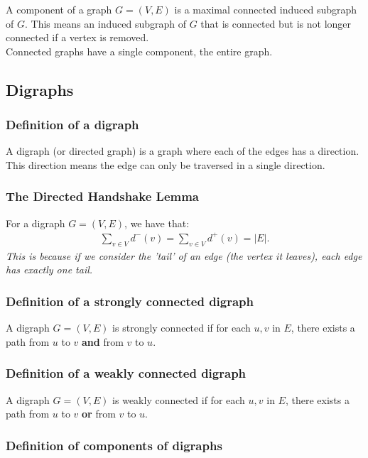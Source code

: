\documentclass[a4paper, 12pt, twoside]{article}
\begin{document}
A component of a graph $G = (V, E)$ is a maximal connected 
induced subgraph of $G$. This means an induced subgraph of $G$
that is connected but is not longer connected if a vertex is
removed.
\\[\baselineskip]
Connected graphs have a single component, the entire graph.

\subsection{Digraphs}

\subsubsection{Definition of a digraph}

A digraph (or directed graph) is a graph where each of the edges
has a direction. This direction means the edge can only be traversed
in a single direction.

\subsubsection{The Directed Handshake Lemma}

For a digraph $G = (V, E)$, we have that: \begin{gather*}
  \sum_{v \in V} d^-(v) = \sum_{v \in V} d^+(v) = |E|.
\end{gather*} \textit{This is because if we consider the 'tail' of an
edge (the vertex it leaves), each edge has exactly one tail.}

\subsubsection{Definition of a strongly connected digraph}

A digraph $G = (V, E)$ is strongly connected if for each $u, v$
in $E$, there exists a path from $u$ to $v$ \textbf{and} 
from $v$ to $u$.

\subsubsection{Definition of a weakly connected digraph}

A digraph $G = (V, E)$ is weakly connected if for each $u, v$
in $E$, there exists a path from $u$ to $v$ \textbf{or} 
from $v$ to $u$.

\subsubsection{Definition of components of digraphs}
\end{document}
